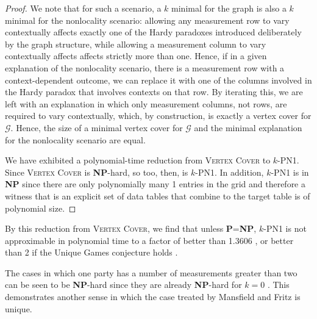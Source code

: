 \documentclass{amsart}
\theoremstyle{definition}
\begin{document}
\begin{proof}

We note that for such a scenario, a $k$ minimal for the graph is also a $k$ minimal for the nonlocality scenario: allowing any measurement row to vary contextually affects exactly one of the Hardy paradoxes introduced deliberately by the graph structure, while allowing a measurement column to vary contextually affects affects strictly more than one. Hence, if in a given explanation of the nonlocality scenario, there is a measurement row with a context-dependent outcome, we can replace it with one of the columns involved in the Hardy paradox that involves contexts on that row. By iterating this, we are left with an explanation in which only measurement columns, not rows, are required to vary contextually, which, by construction, is exactly a vertex cover for $\mathcal{G}$. Hence, the size of a minimal vertex cover for $\mathcal{G}$ and the minimal explanation for the nonlocality scenario are equal.

We have exhibited a polynomial-time reduction from \textsc{Vertex Cover} to $k$-\textsc{PN1}. Since  \textsc{Vertex Cover} is \textbf{NP}-hard, so too, then, is $k$-\textsc{PN1}.  In addition, $k$-\textsc{PN1} is in \textbf{NP} since there are only polynomially many 1 entries in the grid and therefore a witness that is an explicit set of data tables that combine to the target table is of polynomial size.
\end{proof}
By this reduction from \textsc{Vertex Cover}, we find that unless \textbf{P}=\textbf{NP}, $k$-\textsc{PN1} is not approximable in polynomial time to a factor of better than 1.3606 \cite{Dinu04}, or better than 2 if the Unique Games conjecture holds \cite{Khot03}.

The cases in which one party has a number of measurements greater than two can be seen to be \textbf{NP}-hard since they are already \textbf{NP}-hard for $k=0$ \cite{Abra2011,SimmCC}. This demonstrates another sense in which the case treated by Mansfield and Fritz \cite{Mans2011,Mans2016} is unique.
\end{document}
